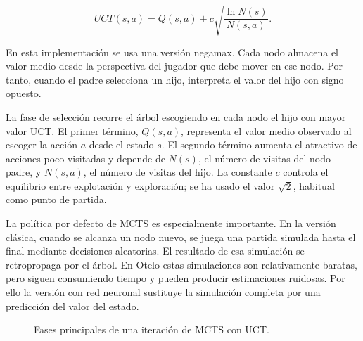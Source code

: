 \documentclass[conference,a4paper]{IEEEtran}
\begin{document}
\begin{equation}
UCT(s,a) = Q(s,a) + c \sqrt{\frac{\ln N(s)}{N(s,a)}}.
\end{equation}

En esta implementación se usa una versión negamax. Cada nodo almacena el valor
medio desde la perspectiva del jugador que debe mover en ese nodo. Por tanto,
cuando el padre selecciona un hijo, interpreta el valor del hijo con signo
opuesto.

La fase de selección recorre el árbol escogiendo en cada nodo el hijo con mayor
valor UCT. El primer término, \(Q(s,a)\), representa el valor medio observado al
escoger la acción \(a\) desde el estado \(s\). El segundo término aumenta el
atractivo de acciones poco visitadas y depende de \(N(s)\), el número de visitas
del nodo padre, y \(N(s,a)\), el número de visitas del hijo. La constante \(c\)
controla el equilibrio entre explotación y exploración; se ha usado el valor
\(\sqrt{2}\), habitual como punto de partida.

La política por defecto de MCTS es especialmente importante. En la versión
clásica, cuando se alcanza un nodo nuevo, se juega una partida simulada hasta el
final mediante decisiones aleatorias. El resultado de esa simulación se
retropropaga por el árbol. En Otelo estas simulaciones son relativamente baratas,
pero siguen consumiendo tiempo y pueden producir estimaciones ruidosas. Por ello
la versión con red neuronal sustituye la simulación completa por una predicción
del valor del estado.

\begin{figure}[t]
\centering
{}
\caption{Fases principales de una iteración de MCTS con UCT.}
\label{fig:fases-uct}
\end{figure}
\end{document}
